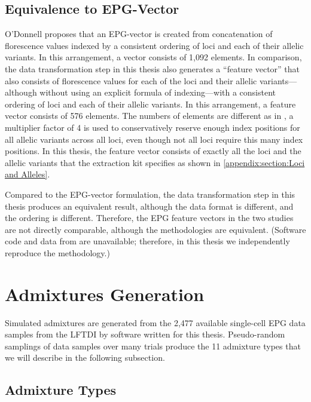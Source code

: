 \subsection{Equivalence to EPG-Vector}

O'Donnell \cite{odonnell_clustering_2021} proposes that an EPG-vector is created from concatenation of florescence values indexed by a consistent ordering of loci and each of their allelic variants. In this arrangement, a vector consists of 1,092 elements. In comparison, the data transformation step in this thesis also generates a ``feature vector'' that also consists of florescence values for each of the loci and their allelic variants---although without using an explicit formula of indexing---with a consistent ordering of loci and each of their allelic variants. In this arrangement, a feature vector consists of 576 elements. The numbers of elements are different as in \cite{odonnell_clustering_2021}, a multiplier factor of 4 is used to conservatively reserve enough index positions for all allelic variants across all loci, even though not all loci require this many index positions. In this thesis, the feature vector consists of exactly all the loci and the allelic variants that the extraction kit specifies as shown in \cref{appendix:section:Loci and Alleles}.

Compared to the EPG-vector formulation, the data transformation step in this thesis produces an equivalent result, although the data format is different, and the ordering is different. Therefore, the EPG feature vectors in the two studies are not directly comparable, although the methodologies are equivalent. (Software code and data from \cite{odonnell_clustering_2021} are unavailable; therefore, in this thesis we independently reproduce the methodology.)

\section{Admixtures Generation}

Simulated admixtures are generated from the 2,477 available single-cell EPG data samples from the LFTDI by software written for this thesis. Pseudo-random samplings of data samples over many trials produce the 11 admixture types that we will describe in the following subsection.

\subsection{Admixture Types}

